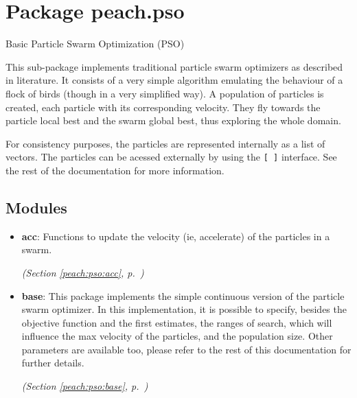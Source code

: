 %
%
%


\section{Package peach.pso}

    \label{peach:pso}

Basic Particle Swarm Optimization (PSO)

This sub-package implements traditional particle swarm optimizers as described
in literature. It consists of a very simple algorithm emulating the behaviour
of a flock of birds (though in a very simplified way). A population of particles
is created, each particle with its corresponding velocity. They fly towards the
particle local best and the swarm global best, thus exploring the whole domain.

For consistency purposes, the particles are represented internally as a list of
vectors. The particles can be acessed externally by using the \texttt{{[} {]}} interface.
See the rest of the documentation for more information.


\subsection{Modules}

\begin{itemize}
\setlength{\parskip}{0ex}
\item \textbf{acc}: 
Functions to update the velocity (ie, accelerate) of the particles in a swarm.


  \textit{(Section \ref{peach:pso:acc}, p.~\pageref{peach:pso:acc})}

\item \textbf{base}: 
This package implements the simple continuous version of the particle swarm
optimizer. In this implementation, it is possible to specify, besides the
objective function and the first estimates, the ranges of search, which will
influence the max velocity of the particles, and the population size. Other
parameters are available too, please refer to the rest of this documentation for
further details.


  \textit{(Section \ref{peach:pso:base}, p.~\pageref{peach:pso:base})}

\end{itemize}

